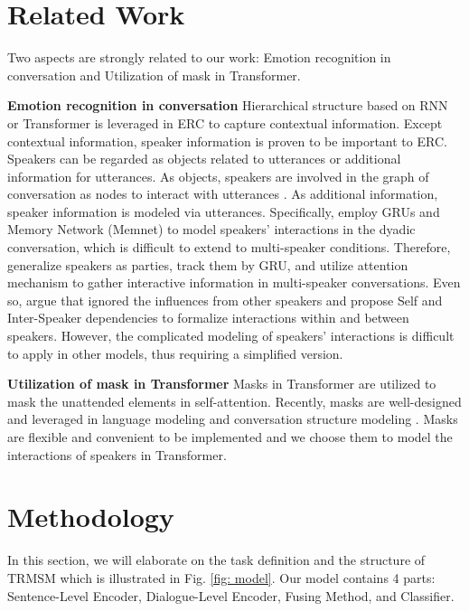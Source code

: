 \documentclass[letterpaper]{article} \usepackage{aaai21}  \usepackage{times}  \usepackage{helvet} \usepackage{courier}  \usepackage[hyphens]{url}  \usepackage{graphicx} \urlstyle{rm} \def\UrlFont{\rm}  \usepackage{natbib}  \usepackage{caption} \usepackage{multirow}
\begin{document}
\section{Related Work}

Two aspects are strongly related to our work: Emotion recognition in conversation and Utilization of mask in Transformer. 

\textbf{Emotion recognition in conversation} \quad Hierarchical structure based on RNN \citep{AGHMN,HiGRUs} or Transformer \citep{KET,HiTrans} is leveraged in ERC to capture contextual information. Except contextual information, speaker information is proven to be important to ERC. Speakers can be regarded as objects related to utterances or additional information for utterances. As objects, speakers are involved in the graph of conversation as nodes to interact with utterances \citep{ConvGCN}. As additional information, speaker information is modeled via utterances. Specifically, \citet{CMN,ICON} employ GRUs and Memory Network (Memnet) \citep{MN} to model speakers' interactions in the dyadic conversation, which is difficult to extend to multi-speaker conditions. Therefore, \citet{DialogueRNN} generalize speakers as parties, track them by GRU, and utilize attention mechanism to gather interactive information in multi-speaker conversations. Even so, \citet{DialogueGCN} argue that \citet{DialogueRNN} ignored the influences from other speakers and propose Self and Inter-Speaker dependencies to formalize interactions within and between speakers. However, the complicated modeling of speakers' interactions is difficult to apply in other models, thus requiring a simplified version. 

\textbf{Utilization of mask in Transformer} \quad Masks in Transformer are utilized to mask the unattended elements in self-attention. Recently, masks are well-designed and leveraged in language modeling \citep{UniLM,BERT,GPT} and conversation structure modeling \citep{StrucureTrans}. Masks are flexible and convenient to be implemented and we choose them to model the interactions of speakers in Transformer. 





\section{Methodology}

In this section, we will elaborate on the task definition and the structure of TRMSM which is illustrated in Fig. \ref{fig: model}. Our model contains 4 parts: Sentence-Level Encoder, Dialogue-Level Encoder, Fusing Method, and Classifier. 
\end{document}
